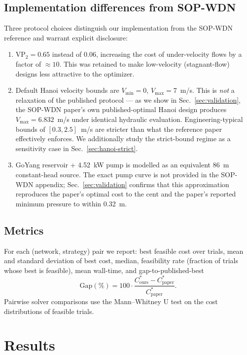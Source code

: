 \documentclass[conference]{IEEEtran}
\begin{document}
\subsection{Implementation differences from SOP-WDN}
\label{sec:protocol}
Three protocol choices distinguish our implementation from the SOP-WDN reference and warrant explicit disclosure:
\begin{enumerate}
\item $\mathrm{VP}_2=0.65$ instead of $0.06$, increasing the cost of under-velocity flows by a factor of $\approx10$. This was retained to make low-velocity (stagnant-flow) designs less attractive to the optimizer.
\item Default Hanoi velocity bounds are $V_{\min}=0$, $V_{\max}=7$~m/s. This is \emph{not} a relaxation of the published protocol --- as we show in Sec.~\ref{sec:validation}, the SOP-WDN paper's own published-optimal Hanoi design produces $V_{\max}=6.832$~m/s under identical hydraulic evaluation. Engineering-typical bounds of $[0.3, 2.5]$~m/s are stricter than what the reference paper effectively enforces. We additionally study the strict-bound regime as a sensitivity case in Sec.~\ref{sec:hanoi-strict}.
\item GoYang reservoir + 4.52~kW pump is modelled as an equivalent 86~m constant-head source. The exact pump curve is not provided in the SOP-WDN appendix; Sec.~\ref{sec:validation} confirms that this approximation reproduces the paper's optimal cost to the cent and the paper's reported minimum pressure to within 0.32~m.
\end{enumerate}

\subsection{Metrics}
For each (network, strategy) pair we report: best feasible cost over trials, mean and standard deviation of best cost, median, feasibility rate (fraction of trials whose best is feasible), mean wall-time, and gap-to-published-best
\begin{equation}
\mathrm{Gap}(\%) = 100\cdot\frac{C^*_\text{ours} - C^*_\text{paper}}{C^*_\text{paper}}.
\end{equation}
Pairwise solver comparisons use the Mann--Whitney U test on the cost distributions of feasible trials.

\section{Results}
\label{sec:results}
\end{document}
